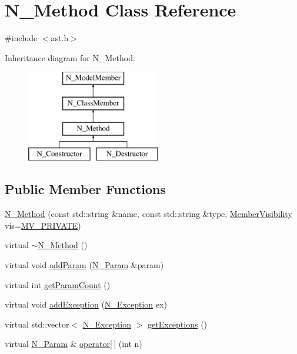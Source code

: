 \hypertarget{classN__Method}{}\section{N\+\_\+\+Method Class Reference}
\label{classN__Method}


{\ttfamily \#include $<$ast.\+h$>$}

Inheritance diagram for N\+\_\+\+Method\+:\begin{figure}[H]
\begin{center}
\leavevmode
\includegraphics[height=4.000000cm]{classN__Method}
\end{center}
\end{figure}
\subsection*{Public Member Functions}
\begin{DoxyCompactItemize}
\item 
\hyperlink{classN__Method_a107d80e851cfa8d79723f78995c1c07c}{N\+\_\+\+Method} (const std\+::string \&name, const std\+::string \&type, \hyperlink{ast_8h_a8cf536792064de0e4fc620bc6f1dc90e}{Member\+Visibility} vis=\hyperlink{ast_8h_a8cf536792064de0e4fc620bc6f1dc90eae560d950ff759756c70399d8cfe015d0}{M\+V\+\_\+\+P\+R\+I\+V\+A\+T\+E})
\item 
virtual \hyperlink{classN__Method_abbaaaf1df2791d4cc1373f8c0a4d6130}{$\sim$\+N\+\_\+\+Method} ()
\item 
virtual void \hyperlink{classN__Method_a54ec9f1349dd7aa0ccf91da7cf362a2f}{add\+Param} (\hyperlink{classN__Param}{N\+\_\+\+Param} \&param)
\item 
virtual int \hyperlink{classN__Method_aa89de3b7072f61310dd0df6473020066}{get\+Param\+Count} ()
\item 
virtual void \hyperlink{classN__Method_a7df4753362b077d86945ce621586deb6}{add\+Exception} (\hyperlink{classN__Exception}{N\+\_\+\+Exception} ex)
\item 
virtual std\+::vector$<$ \hyperlink{classN__Exception}{N\+\_\+\+Exception} $>$ \hyperlink{classN__Method_abb334c1b5806d9e9f22a3565de8f0996}{get\+Exceptions} ()
\item 
virtual \hyperlink{classN__Param}{N\+\_\+\+Param} \& \hyperlink{classN__Method_a1c889024bf36ad9d4e088a6ca4581a87}{operator\mbox{[}$\,$\mbox{]}} (int n)
\end{DoxyCompactItemize}
